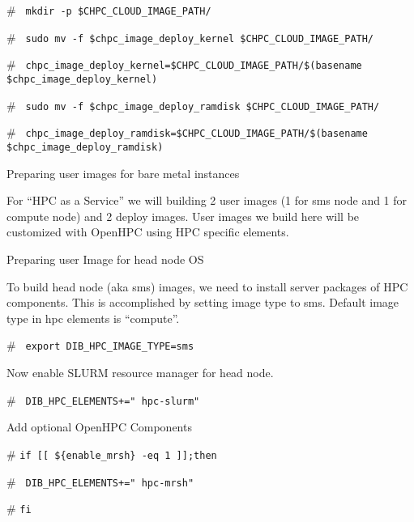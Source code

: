 \begin{section}
{\begin{bash}[ctrlr]\# \texttt{\small{ mkdir -p \$CHPC\_CLOUD\_IMAGE\_PATH/}}\end{bash}
\begin{bash}[ctrlr]\# \texttt{\small{ sudo mv -f \$chpc\_image\_deploy\_kernel \$CHPC\_CLOUD\_IMAGE\_PATH/}}\end{bash}
\begin{bash}[ctrlr]\# \texttt{\small{ chpc\_image\_deploy\_kernel=\$CHPC\_CLOUD\_IMAGE\_PATH/\$(basename \$chpc\_image\_deploy\_kernel)}}\end{bash}
\begin{bash}[ctrlr]\# \texttt{\small{ sudo mv -f \$chpc\_image\_deploy\_ramdisk \$CHPC\_CLOUD\_IMAGE\_PATH/}}\end{bash}
\begin{bash}[ctrlr]\# \texttt{\small{ chpc\_image\_deploy\_ramdisk=\$CHPC\_CLOUD\_IMAGE\_PATH/\$(basename \$chpc\_image\_deploy\_ramdisk)}}\end{bash}

Preparing user images for bare metal instances

For “HPC as a Service” we will building 2 user images (1 for sms node and 1 for compute node) and 2 deploy images. User images we build here will be customized with OpenHPC using HPC specific elements. 


Preparing user Image for head node OS

To build head node (aka sms) images, we need to install server packages of HPC components. This is accomplished by setting image type to sms. Default image type in hpc elements is “compute”.

\begin{bash}[ctrlr]\# \texttt{\small{ export DIB\_HPC\_IMAGE\_TYPE=sms}}\end{bash}

Now enable SLURM resource manager for head node.

\begin{bash}[ctrlr]\# \texttt{\small{ DIB\_HPC\_ELEMENTS+=" hpc-slurm"}}\end{bash}

Add optional OpenHPC Components

\begin{bash}[ctrlr]\# \texttt{\small{if [[ \$\{enable\_mrsh\} -eq 1 ]];then}}\end{bash}
\begin{bash}[ctrlr]\# \texttt{\small{       DIB\_HPC\_ELEMENTS+=" hpc-mrsh"}}\end{bash}
\begin{bash}[ctrlr]\# \texttt{\small{fi}}\end{bash}

}
\end{section}
